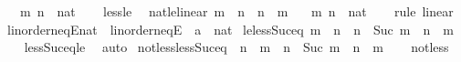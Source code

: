 \begin{isabellebody}
\ \ \ m\ n\ {\isacharcolon}{\kern0pt}{\isacharcolon}{\kern0pt}\ nat\isanewline
%
\isadelimproof
\ \ %
\endisadelimproof
%
\isatagproof
{}\isamarkupfalse%
\ less{\isacharunderscore}{\kern0pt}le\ \isacommand{{\isachardot}{\kern0pt}{\isachardot}{\kern0pt}}\isamarkupfalse%
%
\endisatagproof
{\isafoldproof}%
%
\isadelimproof
\isanewline
%
\endisadelimproof
\isanewline
{}\isamarkupfalse%
\ nat{\isacharunderscore}{\kern0pt}le{\isacharunderscore}{\kern0pt}linear{\isacharcolon}{\kern0pt}\ {\isachardoublequoteopen}m\ {\isasymle}\ n\ {\isasymor}\ n\ {\isasymle}\ m{\isachardoublequoteclose}\isanewline
\ \ \ m\ n\ {\isacharcolon}{\kern0pt}{\isacharcolon}{\kern0pt}\ nat\isanewline
%
\isadelimproof
\ \ %
\endisadelimproof
%
\isatagproof
{}\isamarkupfalse%
\ {\isacharparenleft}{\kern0pt}rule\ linear{\isacharparenright}{\kern0pt}%
\endisatagproof
{\isafoldproof}%
%
\isadelimproof
\isanewline
%
\endisadelimproof
\isanewline
{}\isamarkupfalse%
\ linorder{\isacharunderscore}{\kern0pt}neqE{\isacharunderscore}{\kern0pt}nat\ {\isacharequal}{\kern0pt}\ linorder{\isacharunderscore}{\kern0pt}neqE\ {\isacharbrackleft}{\kern0pt}\ {\isacharprime}{\kern0pt}a\ {\isacharequal}{\kern0pt}\ nat{\isacharbrackright}{\kern0pt}\isanewline
\isanewline
{}\isamarkupfalse%
\ le{\isacharunderscore}{\kern0pt}less{\isacharunderscore}{\kern0pt}Suc{\isacharunderscore}{\kern0pt}eq{\isacharcolon}{\kern0pt}\ {\isachardoublequoteopen}m\ {\isasymle}\ n\ {\isasymLongrightarrow}\ n\ {\isacharless}{\kern0pt}\ Suc\ m\ {\isasymlongleftrightarrow}\ n\ {\isacharequal}{\kern0pt}\ m{\isachardoublequoteclose}\isanewline
%
\isadelimproof
\ \ %
\endisadelimproof
%
\isatagproof
{}\isamarkupfalse%
\ less{\isacharunderscore}{\kern0pt}Suc{\isacharunderscore}{\kern0pt}eq{\isacharunderscore}{\kern0pt}le\ \isamarkupfalse%
\ auto%
\endisatagproof
{\isafoldproof}%
%
\isadelimproof
\isanewline
%
\endisadelimproof
\isanewline
{}\isamarkupfalse%
\ not{\isacharunderscore}{\kern0pt}less{\isacharunderscore}{\kern0pt}less{\isacharunderscore}{\kern0pt}Suc{\isacharunderscore}{\kern0pt}eq{\isacharcolon}{\kern0pt}\ {\isachardoublequoteopen}{\isasymnot}\ n\ {\isacharless}{\kern0pt}\ m\ {\isasymLongrightarrow}\ n\ {\isacharless}{\kern0pt}\ Suc\ m\ {\isasymlongleftrightarrow}\ n\ {\isacharequal}{\kern0pt}\ m{\isachardoublequoteclose}\isanewline
%
\isadelimproof
\ \ %
\endisadelimproof
%
\isatagproof
{}\isamarkupfalse%
\ not{\isacharunderscore}{\kern0pt}less\ \isamarkupfalse%

\end{isabellebody}
